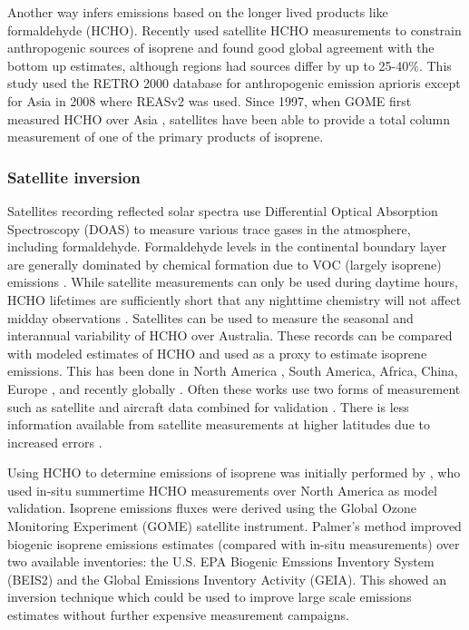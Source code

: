     Another way infers emissions based on the longer lived products like formaldehyde (HCHO).
    Recently \cite{Stavrakou2015} used satellite HCHO measurements to constrain anthropogenic sources of isoprene and found good global agreement with the bottom up estimates, although regions had sources differ by up to 25-40\%. 
    This study used the RETRO 2000 database for anthropogenic emission aprioris except for Asia in 2008 where REASv2 was used. 
    Since 1997, when GOME first measured HCHO over Asia \citep{Thomas1998}, satellites have been able to provide a total column measurement of one of the primary products of isoprene.
    
    \subsubsection{Satellite inversion}
	    Satellites recording reflected solar spectra use Differential Optical Absorption Spectroscopy (DOAS) to measure various trace gases in the atmosphere, including formaldehyde. 
	    Formaldehyde levels in the continental boundary layer are generally dominated by chemical formation due to VOC (largely isoprene) emissions \citep{Kefauver2014}.
	    While satellite measurements can only be used during daytime hours, HCHO lifetimes are sufficiently short that any nighttime chemistry will not affect midday observations \citep{Wolfe2016}.
	    Satellites can be used to measure the seasonal and interannual variability of HCHO over Australia.
	    These records can be compared with modeled estimates of HCHO and used as a proxy to estimate isoprene emissions.
	    This has been done in North America \citep{Palmer2003, Millet2006}, South America, Africa, China, Europe \citep{Dufour2009}, and recently globally \citep{FortemsCheiney2012, Bauwens2016}.
	    Often these works use two forms of measurement such as satellite and aircraft data combined for validation \citep{Marais2014}.
	    There is less information available from satellite measurements at higher latitudes due to increased errors \citep{DeSmedt2015}.
	    
	    Using HCHO to determine emissions of isoprene was initially performed by \cite{Palmer2001, Palmer2003}, who used in-situ summertime HCHO measurements over North America as model validation.
	    Isoprene emissions fluxes were derived using the Global Ozone Monitoring Experiment (GOME) satellite instrument.
	    Palmer's method improved biogenic isoprene emissions estimates (compared with in-situ measurements) over two available inventories: the U.S. EPA Biogenic Emssions Inventory System (BEIS2) and the Global Emissions Inventory Activity (GEIA).
	    This showed an inversion technique which could be used to improve large scale emissions estimates without further expensive measurement campaigns.
	    
